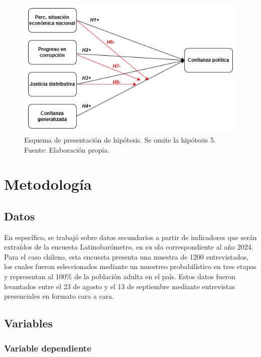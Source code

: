 \documentclass[12pt,twoside]{templates/facsothesis}
\begin{document}
\begin{figure}[!ht]

{\centering \includegraphics[width=0.8\linewidth,]{IPO/output/graphs/hipotesis_tesis} 

}

\caption{Esquema de presentación de hipótesis. Se omite la hipótesis 5. Fuente: Elaboración propia.}\label{fig:grafico-1}
\end{figure}

\chapter{Metodología}\label{metodologuxeda}

\section{Datos}\label{datos}

En específico, se trabajó sobre datos secundarios a partir de indicadores que serán extraídos de la encuesta Latinobarómetro, en su ola correspondiente al año 2024. Para el caso chileno, esta encuesta presenta una muestra de 1200 entrevistados, los cuales fueron seleccionados mediante un muestreo probabilístico en tres etapas y representan al 100\% de la población adulta en el país. Estos datos fueron levantados entre el 23 de agosto y el 13 de septiembre mediante entrevistas presenciales en formato cara a cara.

\section{Variables}\label{variables}

\subsection{Variable dependiente}\label{variable-dependiente}
\end{document}
